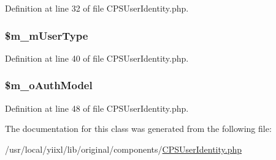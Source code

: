 Definition at line 32 of file CPSUserIdentity.php.

\hypertarget{classCPSUserIdentity_a03c042bf46af7a0170b937e5adf4a113}{
\subsubsection[{\$m\_\-mUserType}]{\setlength{\rightskip}{0pt plus 5cm}\$m\_\-mUserType}}
\label{classCPSUserIdentity_a03c042bf46af7a0170b937e5adf4a113}


Definition at line 40 of file CPSUserIdentity.php.

\hypertarget{classCPSUserIdentity_aad5342b604a5d72702f5ea319a9e2769}{
\subsubsection[{\$m\_\-oAuthModel}]{\setlength{\rightskip}{0pt plus 5cm}\$m\_\-oAuthModel}}
\label{classCPSUserIdentity_aad5342b604a5d72702f5ea319a9e2769}


Definition at line 48 of file CPSUserIdentity.php.



The documentation for this class was generated from the following file:\begin{DoxyCompactItemize}
\item 
/usr/local/yiixl/lib/original/components/\hyperlink{CPSUserIdentity_8php}{CPSUserIdentity.php}\end{DoxyCompactItemize}
